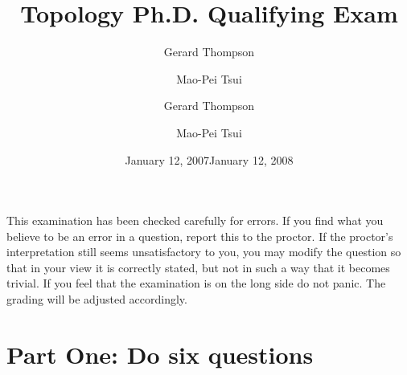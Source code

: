 \documentclass[12pt]{exam}
\author{Gerard Thompson \and Mao-Pei Tsui }
\date{January 12, 2007}
\theoremstyle{definition}
\begin{document}
\title{Topology Ph.D. Qualifying Exam}
\author{Gerard Thompson \and Mao-Pei Tsui }
\date{January 12, 2008}
\maketitle \noindent This examination  has been checked carefully for errors. If you find what you believe to be
an error in a question, report this to the proctor. If the proctor's interpretation still seems unsatisfactory to
you,  you may modify the question so that in your view it is correctly stated, but not in such a way that it
becomes trivial. If you feel that the examination is on the long side do not panic. The grading will be adjusted
accordingly.

\setcounter{page}{1}

\section{Part One: Do six questions}
\end{document}
